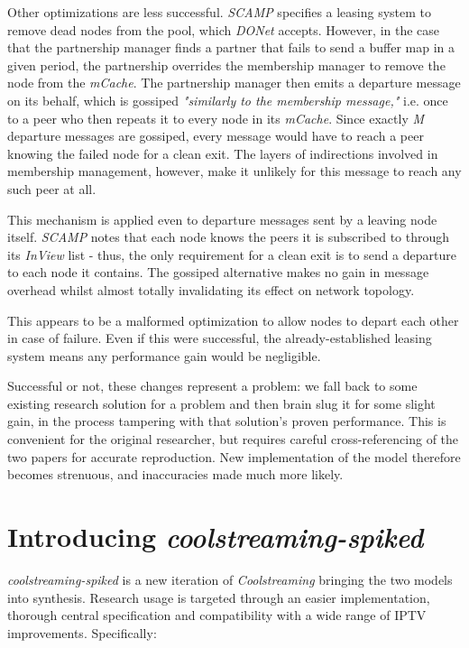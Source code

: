 \documentclass[12pt,a4paper]{article}
\begin{document}
Other optimizations are less successful. \textit{SCAMP} specifies a leasing system to remove dead nodes from the pool, which \textit{DONet} accepts. However, in the case that the partnership manager finds a partner that fails to send a buffer map in a given period, the partnership overrides the membership manager to remove the node from the \textit{mCache}. The partnership manager then emits a departure message on its behalf, which is gossiped \textit{"similarly to the membership message,"} i.e. once to a peer who then repeats it to every node in its \textit{mCache}. Since exactly \textit{M} departure messages are gossiped, every message would have to reach a peer knowing the failed node for a clean exit. The layers of indirections involved in membership management, however, make it unlikely for this message to reach any such peer at all.

This mechanism is applied even to departure messages sent by a leaving node itself. \textit{SCAMP} notes that each node knows the peers it is subscribed to through its \textit{InView} list - thus, the only requirement for a clean exit is to send a departure to each node it contains. The gossiped alternative makes no gain in message overhead whilst almost totally invalidating its effect on network topology.

This appears to be a malformed optimization to allow nodes to depart each other in case of failure. Even if this were successful, the already-established leasing system means any performance gain would be negligible.

Successful or not, these changes represent a problem: we fall back to some existing research solution for a problem and then brain slug  it for some slight gain, in the process tampering with that solution's proven performance. This is convenient for the original researcher, but requires careful cross-referencing of the two papers for accurate reproduction. New implementation of the model therefore becomes strenuous, and inaccuracies made much more likely.


\section{Introducing \textit{coolstreaming-spiked}} \label{css}
\textit{coolstreaming-spiked} is a new iteration of \textit{Coolstreaming} bringing the two models into synthesis. Research usage is targeted through an easier implementation, thorough central specification and compatibility with a wide range of IPTV improvements. Specifically:
\end{document}
